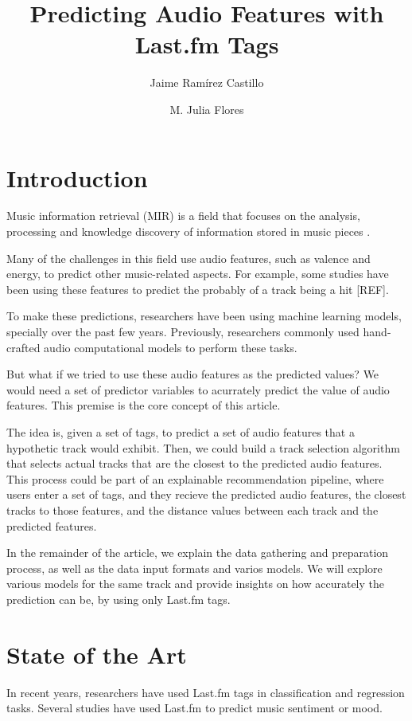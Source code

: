 \documentclass[fleqn,10pt]{olplainarticle}
\title{Predicting Audio Features with Last.fm Tags}
\author[1]{Jaime Ramírez Castillo}
\author[1]{M. Julia Flores}
\affil[1]{Departamento de Sistemas Informáticos, Universidad de Castilla - La Mancha, Spain}
\begin{document}
\flushbottom
\maketitle
\thispagestyle{empty}

\section*{Introduction}

Music information retrieval (MIR) is a field that focuses on the analysis, processing and knowledge discovery of information stored in music pieces \cite{ramirez2020machine}.

Many of the challenges in this field use audio features, such as valence and energy, to predict other music-related aspects.
For example, some studies have been using these features to predict the probably of a track being a hit [REF].

To make these predictions, researchers have been using machine learning models, specially over the past few years.
Previously, researchers commonly used hand-crafted audio computational models to perform these tasks.

But what if we tried to use these audio features as the predicted values? We would need a set of predictor variables to
acurrately predict the value of audio features.
This premise is the core concept of this article.

The idea is, given a set of tags, to predict a set of audio features that a hypothetic track would exhibit.
Then, we could build a track selection algorithm that selects actual tracks that are the closest to the predicted audio features.
This process could be part of an explainable recommendation pipeline, where users enter a set of tags, and they recieve the predicted audio features, the closest tracks to those features, and the distance values between each track and the predicted features.

In the remainder of the article, we explain the data gathering and preparation process, as well as the data input formats and varios models.
We will explore various models for the same track and provide insights on how accurately the prediction can be, by using only Last.fm tags.

\section*{State of the Art}

In recent years, researchers have used Last.fm tags in classification and regression tasks.
Several studies have used Last.fm to predict music sentiment or mood.
\end{document}

